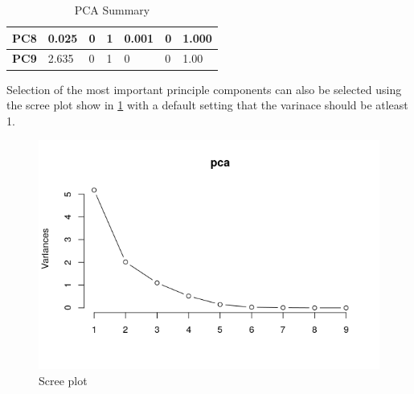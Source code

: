 \documentclass[12pt,a4paper]{article}
\begin{document}
\begin{enumerate}[label=\roman*)]
\begin{table}[h]
\begin{tabular}{|l|l|l|l|l|l|l|}
	\textbf{PC8}       & 0.025            & 0                                                                          & 1                                                                         & 0.001            & 0                                                                          & 1.000                                                                     \\ \hline
	\textbf{PC9}       & 2.635            & 0                                                                          & 1                                                                         & 0                & 0                                                                          & 1.00                                                                      \\ \hline
	\end{tabular}
\caption{PCA Summary}
\label{ps1}
\end{table}

\noindent Selection of the most important principle components can also be selected using the scree plot show in \ref{fig:screep} with a default setting that the varinace should be atleast 1.


\begin{figure}[h]
	\centering
	\includegraphics[width=0.7\linewidth]{ScreeP}
	\caption{Scree plot}
	\label{fig:screep}
\end{figure}


\end{enumerate}
\end{document}
